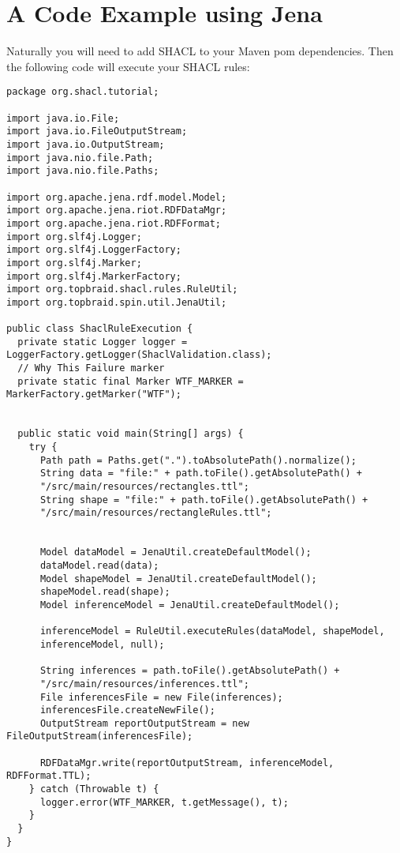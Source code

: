 \documentclass{amsart}
\begin{document}
  
  \section{A Code Example using Jena}
  Naturally you will need to add SHACL to your Maven pom dependencies. Then the following code will execute your SHACL rules:
  
  \begin{small}
  \begin{Verbatim}   
package org.shacl.tutorial;

import java.io.File;
import java.io.FileOutputStream;
import java.io.OutputStream;
import java.nio.file.Path;
import java.nio.file.Paths;

import org.apache.jena.rdf.model.Model;
import org.apache.jena.riot.RDFDataMgr;
import org.apache.jena.riot.RDFFormat;
import org.slf4j.Logger;
import org.slf4j.LoggerFactory;
import org.slf4j.Marker;
import org.slf4j.MarkerFactory;
import org.topbraid.shacl.rules.RuleUtil;
import org.topbraid.spin.util.JenaUtil;

public class ShaclRuleExecution {
  private static Logger logger = LoggerFactory.getLogger(ShaclValidation.class);
  // Why This Failure marker
  private static final Marker WTF_MARKER = MarkerFactory.getMarker("WTF");

  
  public static void main(String[] args) {
    try {   
      Path path = Paths.get(".").toAbsolutePath().normalize();
      String data = "file:" + path.toFile().getAbsolutePath() + 
	  "/src/main/resources/rectangles.ttl";
      String shape = "file:" + path.toFile().getAbsolutePath() + 
	  "/src/main/resources/rectangleRules.ttl";   
      
      
      Model dataModel = JenaUtil.createDefaultModel();
      dataModel.read(data);
      Model shapeModel = JenaUtil.createDefaultModel();
      shapeModel.read(shape);
      Model inferenceModel = JenaUtil.createDefaultModel();
      
      inferenceModel = RuleUtil.executeRules(dataModel, shapeModel, 
	  inferenceModel, null);
      
      String inferences = path.toFile().getAbsolutePath() + 
	  "/src/main/resources/inferences.ttl";
      File inferencesFile = new File(inferences);
      inferencesFile.createNewFile();     
      OutputStream reportOutputStream = new FileOutputStream(inferencesFile);
      
      RDFDataMgr.write(reportOutputStream, inferenceModel, RDFFormat.TTL);        
    } catch (Throwable t) {
      logger.error(WTF_MARKER, t.getMessage(), t);
    }   
  }
}
  \end{Verbatim}
  \end{small}
  
\end{document}
